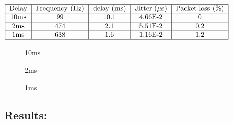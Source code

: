 \begin{center}
  $\begin{tabular}{|c|c|c|c|c|c|}
    \hline
    \text{Delay} & \text{Frequency (Hz)} & \text{delay (ms)} & \text{Jitter ($\mu$s)} & \text{Packet loss (\%)}\\
    \hline
    10ms & 99 & 10.1 & 4.66E-2 & 0 \\
    \hline
    2ms & 474 & 2.1 & 5.51E-2 & 0.2 \\
    \hline
    1ms & 638 & 1.6 & 1.16E-2 & 1.2 \\
    \hline
  \end{tabular}$
\end{center}
\begin{figure}[H]
	\centering
	
	\caption{10ms}
\end{figure} 
\begin{figure}[H]
		\centering
	    
	    \caption{2ms}
\end{figure} 
\begin{figure}[H]
	    \centering
	    
	    \caption{1ms}
\end{figure} 

% 	    
% 	    
% 	    

\subsection*{Results:}


